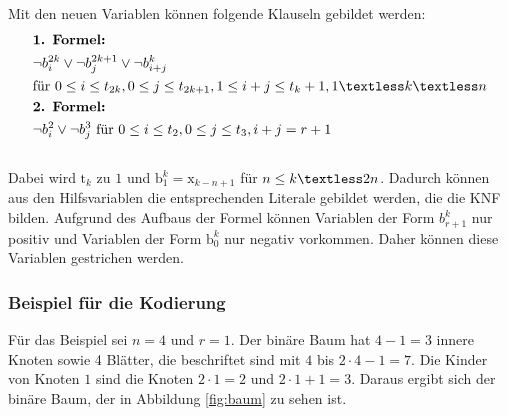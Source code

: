 \documentclass[a4,abstract=on]{scrartcl}
\begin{document}
Mit den neuen Variablen können folgende Klauseln gebildet werden:\\
\begin{align*}
&\textbf{1. Formel:}\\
&\neg b_i^{2k} \vee \neg b_j^{2k+1} \vee \neg b_{i+j}^{k} \\
&\text{für} {~} 0\leq i \leq t_{2k}, 0\leq j \leq t_{2k+1}, 1\leq i+j \leq t_{k}+1, 1\textless k \textless n\\
&\textbf{2. Formel:}\\
&\neg b_i^2 \vee \neg b_j^3 {~} \text{für} {~} 0\leq i \leq t_2, 0\leq j \leq t_3, i+j = r+1\\
\end{align*}
\ \\
Dabei wird $\text{t}_k$ zu $1$ und $\text{b}_1^k = \text{x}_{k-n+1}$ für $n \leq k \textless 2n$. Dadurch können aus den Hilfsvariablen die entsprechenden Literale gebildet werden, die die KNF bilden.
Aufgrund des Aufbaus der Formel können Variablen der Form $b_{r+1}^k$ nur positiv und Variablen der Form $\text{b}_0^k$ nur negativ vorkommen. Daher können diese Variablen gestrichen werden.

\subsubsection*{Beispiel für die Kodierung}
Für das Beispiel sei $n=4$ und $r =1$. Der binäre Baum hat $4-1 = 3$ innere Knoten sowie 4 Blätter, die beschriftet sind mit $4$ bis $2\cdot4-1=7$. Die Kinder von Knoten $1$ sind die Knoten $2\cdot1=2$ und $2\cdot1 +1=3$. Daraus ergibt sich der binäre Baum, der in Abbildung \ref{fig:baum} zu sehen ist.
\end{document}
